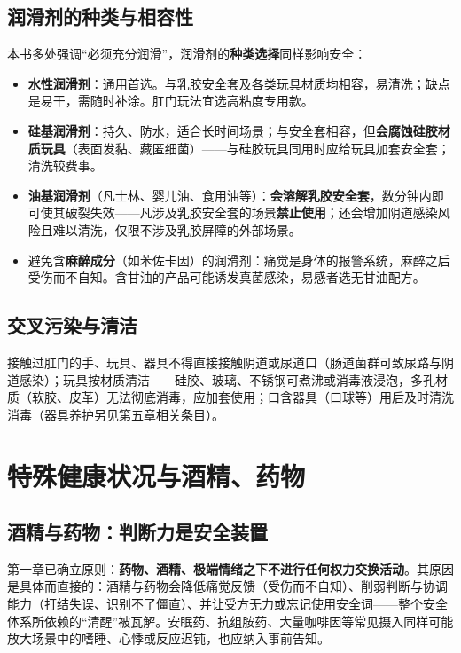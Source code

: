 \documentclass[12pt,UTF8]{ctexbook}
\newcommand{\keyword}[1]{\textbf{#1}}
\begin{document}
\subsection{润滑剂的种类与相容性}

本书多处强调“必须充分润滑”，润滑剂的\textbf{种类选择}同样影响安全：

\begin{itemize}
\item \textbf{水性润滑剂}：通用首选。与乳胶安全套及各类玩具材质均相容，易清洗；缺点是易干，需随时补涂。肛门玩法宜选高粘度专用款。
\item \textbf{硅基润滑剂}：持久、防水，适合长时间场景；与安全套相容，但\keyword{会腐蚀硅胶材质玩具}（表面发黏、藏匿细菌）——与硅胶玩具同用时应给玩具加套安全套；清洗较费事。
\item \textbf{油基润滑剂}（凡士林、婴儿油、食用油等）：\keyword{会溶解乳胶安全套}，数分钟内即可使其破裂失效——凡涉及乳胶安全套的场景\textbf{禁止使用}；还会增加阴道感染风险且难以清洗，仅限不涉及乳胶屏障的外部场景。
\item 避免含\textbf{麻醉成分}（如苯佐卡因）的润滑剂：痛觉是身体的报警系统，麻醉之后受伤而不自知。含甘油的产品可能诱发真菌感染，易感者选无甘油配方。
\end{itemize}

\subsection{交叉污染与清洁}

接触过肛门的手、玩具、器具不得直接接触阴道或尿道口（肠道菌群可致尿路与阴道感染）；玩具按材质清洁——硅胶、玻璃、不锈钢可煮沸或消毒液浸泡，多孔材质（软胶、皮革）无法彻底消毒，应加套使用；口含器具（口球等）用后及时清洗消毒（器具养护另见第五章相关条目）。


\section{特殊健康状况与酒精、药物}\label{sec:specialhealth}

\subsection{酒精与药物：判断力是安全装置}

第一章已确立原则：\keyword{药物、酒精、极端情绪之下不进行任何权力交换活动}。其原因是具体而直接的：酒精与药物会降低痛觉反馈（受伤而不自知）、削弱判断与协调能力（打结失误、识别不了僵直）、并让受方无力或忘记使用安全词——整个安全体系所依赖的“清醒”被瓦解。安眠药、抗组胺药、大量咖啡因等常见摄入同样可能放大场景中的嗜睡、心悸或反应迟钝，也应纳入事前告知。
\end{document}
